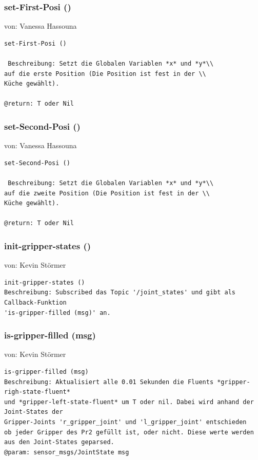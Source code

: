 \documentclass{suturo}
\makeatletter
\newcommand{\chapterauthor}[1]{%
  {\parindent0pt\vspace*{-27pt}%
  \linespread{0}\small\begin{flushright}von: #1\end{flushright}%
  \par\nobreak\vspace*{0pt}}
  \@afterheading%
}
\makeatother
\begin{document}
\subsubsection{set-First-Posi ()}
\chapterauthor{Vanessa Hassouna}
\begin{verbatim}
set-First-Posi ()

 Beschreibung: Setzt die Globalen Variablen *x* und *y*\\
auf die erste Position (Die Position ist fest in der \\
Küche gewählt).

@return: T oder Nil
\end{verbatim}


\subsubsection{set-Second-Posi ()}
\chapterauthor{Vanessa Hassouna}
\begin{verbatim}
set-Second-Posi ()

 Beschreibung: Setzt die Globalen Variablen *x* und *y*\\
auf die zweite Position (Die Position ist fest in der \\
Küche gewählt).

@return: T oder Nil
\end{verbatim}





\subsubsection{init-gripper-states ()}
\chapterauthor{Kevin Störmer}
\begin{verbatim}
init-gripper-states ()
Beschreibung: Subscribed das Topic '/joint_states' und gibt als Callback-Funktion
'is-gripper-filled (msg)' an.
\end{verbatim}

\subsubsection{is-gripper-filled (msg)}
\chapterauthor{Kevin Störmer}
\begin{verbatim}
is-gripper-filled (msg)
Beschreibung: Aktualisiert alle 0.01 Sekunden die Fluents *gripper-righ-state-fluent* 
und *gripper-left-state-fluent* um T oder nil. Dabei wird anhand der Joint-States der
Gripper-Joints 'r_gripper_joint' und 'l_gripper_joint' entschieden
ob jeder Gripper des Pr2 gefüllt ist, oder nicht. Diese werte werden
aus den Joint-States geparsed.
@param: sensor_msgs/JointState msg 
\end{verbatim}
\end{document}
